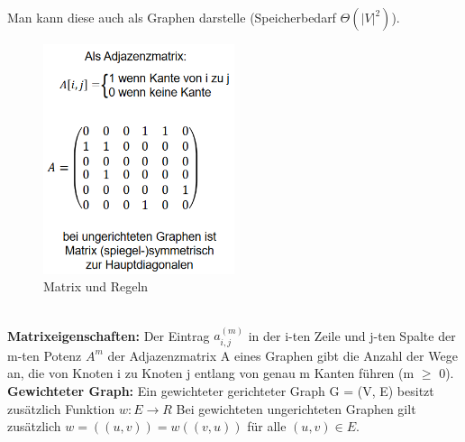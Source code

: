 \documentclass{article}
\begin{document}
            Man kann diese auch als Graphen darstelle (Speicherbedarf $\Theta(|V|^2)$). 
            \begin{figure}[ht]
                \centering
                \includegraphics[width=0.5\textwidth]{Bilder/Matrix.png}
                \caption{Matrix und Regeln}
                \label{fig:Matrix}
            \end{figure}\\
            \newpage
            \textbf{Matrixeigenschaften:} Der Eintrag $a_{i,j}^{(m)}$ in der i-ten Zeile und j-ten Spalte der m-ten Potenz $A^m$ der Adjazenzmatrix A eines Graphen gibt die Anzahl der Wege an, die von Knoten i zu Knoten j entlang von genau m Kanten führen (m $\geq$ 0).\\
            \textbf{Gewichteter Graph:} Ein gewichteter gerichteter Graph G = (V, E) besitzt zusätzlich Funktion $w: E \rightarrow R$ Bei gewichteten ungerichteten Graphen gilt zusätzlich $w=((u,v)) = w((v,u))$ für alle $(u,v)\in E$.
\end{document}
